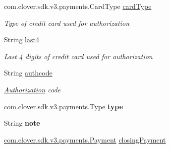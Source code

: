 \begin{DoxyCompactItemize}
com.\+clover.\+sdk.\+v3.\+payments.\+Card\+Type \hyperlink{classcom_1_1clover_1_1sdk_1_1v3_1_1payments_1_1_authorization_a7e999eaa05e1a2d75c4432fca370faf6}{card\+Type}
\begin{DoxyCompactList}\small\item\em Type of credit card used for authorization \end{DoxyCompactList}\item 
String \hyperlink{classcom_1_1clover_1_1sdk_1_1v3_1_1payments_1_1_authorization_a2f971bd5b18aa303bfbda5bf104aa3f4}{last4}
\begin{DoxyCompactList}\small\item\em Last 4 digits of credit card used for authorization \end{DoxyCompactList}\item 
String \hyperlink{classcom_1_1clover_1_1sdk_1_1v3_1_1payments_1_1_authorization_af642899504fe7f2ea5ffd8a8c082075d}{authcode}
\begin{DoxyCompactList}\small\item\em \hyperlink{classcom_1_1clover_1_1sdk_1_1v3_1_1payments_1_1_authorization}{Authorization} code \end{DoxyCompactList}\item 
\mbox{\label{classcom_1_1clover_1_1sdk_1_1v3_1_1payments_1_1_authorization_aa8da508a44373fdaa52d69aba35bbd29}} 
com.\+clover.\+sdk.\+v3.\+payments.\+Type {\bfseries type}
\item 
\mbox{\label{classcom_1_1clover_1_1sdk_1_1v3_1_1payments_1_1_authorization_a16934340a36f1d61da3d54f6500e26aa}} 
String {\bfseries note}
\item 
\hyperlink{classcom_1_1clover_1_1sdk_1_1v3_1_1payments_1_1_payment}{com.\+clover.\+sdk.\+v3.\+payments.\+Payment} \hyperlink{classcom_1_1clover_1_1sdk_1_1v3_1_1payments_1_1_authorization_acc4d1991514fda1f720b7930273c5146}{closing\+Payment}

\end{DoxyCompactItemize}
